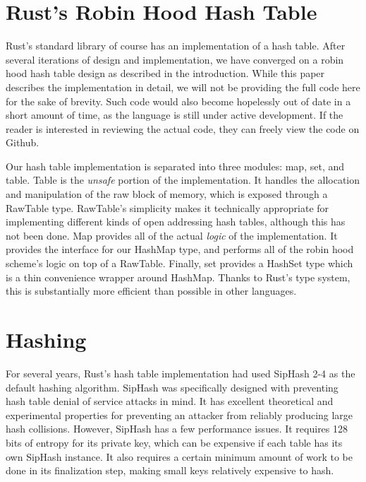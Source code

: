 \documentclass{cccg13}
\begin{document}
\section{Rust's Robin Hood Hash Table}

Rust's standard library of course has an implementation of a hash table. After
several iterations of design and implementation, we have converged on a robin
hood hash table design as described in the introduction. While this paper
describes the implementation in detail, we will not be providing the full code
here for the sake of brevity. Such code would also become hopelessly out of
date in a short amount of time, as the language is still under active
development. If the reader is interested in reviewing the actual code, they
can freely view the code on Github. \cite{rust-source}

Our hash table implementation is separated into three modules: map, set, and
table. Table is the \emph{unsafe} portion of the implementation. It handles
the allocation and manipulation of the raw block of memory, which is exposed
through a RawTable type. RawTable's simplicity makes it technically
appropriate for implementing different kinds of open addressing hash tables,
although this has not been done. Map provides all of the actual \emph{logic}
of the implementation. It provides the interface for our HashMap type, and
performs all of the robin hood scheme's logic on top of a RawTable. Finally,
set provides a HashSet type which is a thin convenience wrapper around
HashMap. Thanks to Rust's type system, this is substantially more efficient
than possible in other languages.





\section{Hashing}
For several years, Rust's hash table implementation had used SipHash 2-4
\cite{siphash} as the default hashing algorithm. SipHash was specifically
designed with preventing hash table denial of service attacks in mind. It has
excellent theoretical and experimental properties for preventing an attacker
from reliably producing large hash collisions. However, SipHash has a few
performance issues. It requires 128 bits of entropy for its private key, which
can be expensive if each table has its own SipHash instance. It also requires
a certain minimum amount of work to be done in its finalization step, making
small keys relatively expensive to hash.
\end{document}
